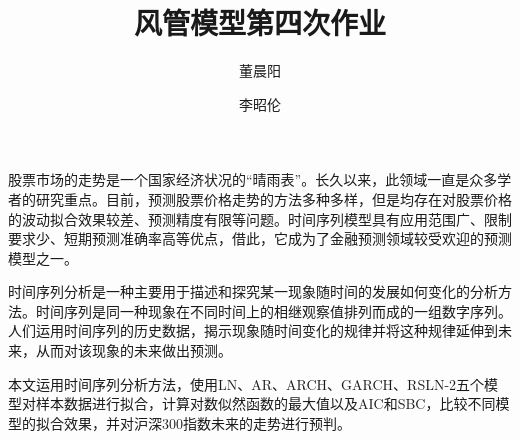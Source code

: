 \documentclass[11pt]{article}
\title{风管模型第四次作业}
\author{董晨阳 \and 李昭伦}
\begin{document}
    \maketitle




    \hypertarget{ux98ceux7ba1ux6a21ux578bux7b2cux56dbux6b21ux4f5cux4e1a}{%
\label{ux98ceux7ba1ux6a21ux578bux7b2cux56dbux6b21ux4f5cux4e1a}}

股票市场的走势是一个国家经济状况的``晴雨表''。长久以来，此领域一直是众多学者的研究重点。目前，预测股票价格走势的方法多种多样，但是均存在对股票价格的波动拟合效果较差、预测精度有限等问题。时间序列模型具有应用范围广、限制要求少、短期预测准确率高等优点，借此，它成为了金融预测领域较受欢迎的预测模型之一。

时间序列分析是一种主要用于描述和探究某一现象随时间的发展如何变化的分析方法。时间序列是同一种现象在不同时间上的相继观察值排列而成的一组数字序列。人们运用时间序列的历史数据，揭示现象随时间变化的规律并将这种规律延伸到未来，从而对该现象的未来做出预测。

本文运用时间序列分析方法，使用LN、AR、ARCH、GARCH、RSLN-2五个模型对样本数据进行拟合，计算对数似然函数的最大值以及AIC和SBC，比较不同模型的拟合效果，并对沪深300指数未来的走势进行预判。
\end{document}
